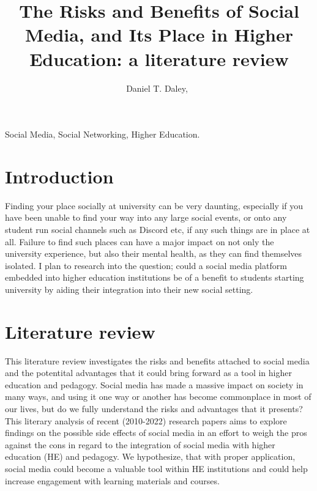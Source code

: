 \documentclass[lettersize,journal]{IEEEtran}
\begin{document}
\title{The Risks and Benefits of Social Media, and Its Place in Higher Education: a literature review}

\author{Daniel T. Daley,~}




\maketitle
\begin{abstract}
\end{abstract}

\begin{IEEEkeywords}
Social Media, Social Networking, Higher Education.
\end{IEEEkeywords}

\section{Introduction}
    Finding your place socially at university can be very daunting,
    especially if you have been unable to find your way into any large
    social events, or onto any student run social channels such as Discord
    etc, if any such things are in place at all. Failure to find such
    places can have a major impact on not only the university experience,
    but also their mental health, as they can find themselves isolated. I
    plan to research into the question; could a social media platform embedded
    into higher education institutions be of a benefit to students starting
    university by aiding their integration into their new social setting.
\section{Literature review}
	This literature review investigates the risks and benefits attached to
    social media and the potentital advantages that it could bring forward as a
    tool in higher education and pedagogy. Social media has made a massive
    impact on society in many ways, and using it one way or another has become
    commonplace in most of our lives, but do we fully understand the risks and
    advantages that it presents? This literary analysis of recent (2010-2022)
    research papers aims to explore findings on the possible side effects of
    social media in an effort to weigh the pros against the cons in regard to
    the integration of social media with higher education (HE) and pedagogy. We
    hypothesize, that with proper application, social media could become a valuable
    tool within HE institutions and could help increase engagement with learning
    materials and courses.
\end{document}
